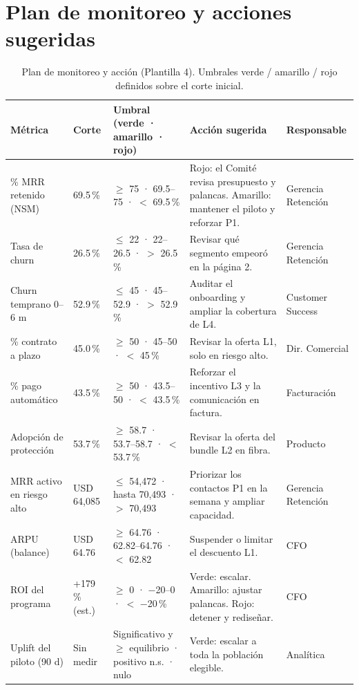 \documentclass[10.5pt,a4paper]{article}
\begin{document}
\section{Plan de monitoreo y acciones sugeridas}
\begin{table}[H]
\centering\footnotesize
\caption{Plan de monitoreo y acción (Plantilla 4). Umbrales verde / amarillo / rojo definidos sobre el corte inicial.}
\begin{tabularx}{\textwidth}{@{}P{2.8cm}P{1.6cm}P{3.6cm}XP{1.7cm}@{}}
\toprule
Métrica & Corte & Umbral (verde · amarillo · rojo) & Acción sugerida & Responsable \\
\midrule
\% MRR retenido (NSM) & 69.5\,\% & $\geq$ 75 · 69.5–75 · $<$ 69.5\,\% & Rojo: el Comité revisa presupuesto y palancas. Amarillo: mantener el piloto y reforzar P1. & Gerencia Retención \\
Tasa de churn & 26.5\,\% & $\leq$ 22 · 22–26.5 · $>$ 26.5\,\% & Revisar qué segmento empeoró en la página 2. & Gerencia Retención \\
Churn temprano 0–6 m & 52.9\,\% & $\leq$ 45 · 45–52.9 · $>$ 52.9\,\% & Auditar el onboarding y ampliar la cobertura de L4. & Customer Success \\
\% contrato a plazo & 45.0\,\% & $\geq$ 50 · 45–50 · $<$ 45\,\% & Revisar la oferta L1, solo en riesgo alto. & Dir. Comercial \\
\% pago automático & 43.5\,\% & $\geq$ 50 · 43.5–50 · $<$ 43.5\,\% & Reforzar el incentivo L3 y la comunicación en factura. & Facturación \\
Adopción de protección & 53.7\,\% & $\geq$ 58.7 · 53.7–58.7 · $<$ 53.7\,\% & Revisar la oferta del bundle L2 en fibra. & Producto \\
MRR activo en riesgo alto & USD 64,085 & $\leq$ 54,472 · hasta 70,493 · $>$ 70,493 & Priorizar los contactos P1 en la semana y ampliar capacidad. & Gerencia Retención \\
ARPU (balance) & USD 64.76 & $\geq$ 64.76 · 62.82–64.76 · $<$ 62.82 & Suspender o limitar el descuento L1. & CFO \\
ROI del programa & +179\,\% (est.) & $\geq$ 0 · −20–0 · $<$ −20\,\% & Verde: escalar. Amarillo: ajustar palancas. Rojo: detener y rediseñar. & CFO \\
Uplift del piloto (90 d) & Sin medir & Significativo y $\geq$ equilibrio · positivo n.s. · nulo & Verde: escalar a toda la población elegible. & Analítica \\
\bottomrule
\end{tabularx}
\end{table}
\end{document}
